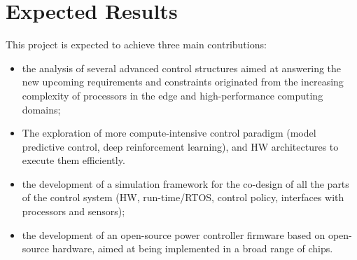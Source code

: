 
\section{Expected Results}
This project is expected to achieve three main contributions:
\begin{itemize}
    \item the analysis of several advanced control structures aimed at answering the new upcoming requirements and constraints originated from the increasing complexity of processors in the edge and high-performance computing domains;
    \item The exploration of more compute-intensive control paradigm (model predictive control, deep reinforcement learning), and HW architectures to execute them efficiently.
    \item the development of a simulation framework for the co-design of all the parts of the control system (HW, run-time/RTOS, control policy, interfaces with processors and sensors);
    \item the development of an open-source power controller firmware based on open-source hardware, aimed at being implemented in a broad range of chips.
\end{itemize}


